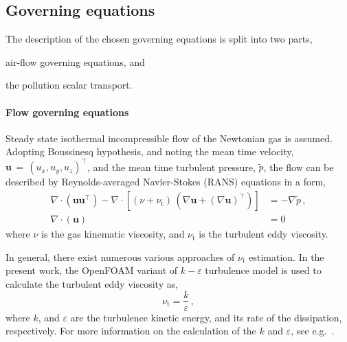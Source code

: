 \subsection{Governing equations}
\label{subsec:govEq}
The description of the chosen governing equations is split into two parts, 
\begin{inparaenum}[(i)]
    \item air-flow governing equations, and
    \item the pollution scalar transport.
\end{inparaenum}

\paragraph{Flow governing equations} Steady state isothermal incompressible flow of the Newtonian gas is assumed. Adopting Boussinesq hypothesis, and noting the mean time velocity, $\bm{u}\,=\,(u_x,u_y,u_z)^\intercal$, and the mean time turbulent pressure, $\tilde{p}$, the flow can be described by Reynolds-averaged Navier-Stokes (RANS) equations in a form,
\begin{align}
    \label{eq:RANS1}
    \nabla\cdot(\bm{u}\bm{u}^\intercal) - \nabla\cdot\left[(\nu + \nu_{\mathrm{t}})\,(\nabla \bm{u} + (\nabla\bm{u})^\intercal)\right] &= - \nabla \tilde{p}\,,\\
    \label{eq:RANS2}
    \nabla\cdot(\bm{u}) &= 0\,
\end{align}
where $\nu$ is the gas kinematic viscosity, and $\nu_{\mathrm{t}}$ is the turbulent eddy viscosity.

In general, there exist numerous various approaches of $\nu_{\mathrm{t}}$ estimation. In the present work, the OpenFOAM variant of $k-\varepsilon$ turbulence model is used to calculate the turbulent eddy viscosity as,
\begin{equation}
    \label{eq:nut}
    \nu_{\mathrm{t}} = \frac{k}{\varepsilon}\,,
\end{equation}
where $k$, and $\varepsilon$ are the turbulence kinetic energy, and its rate of the dissipation, respectively. For more information on the calculation of the $k$ and $\varepsilon$, see e.g.~\cite{moukalled16,launder1974}.

